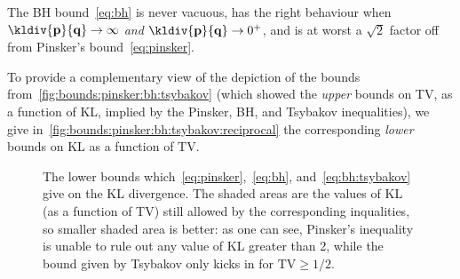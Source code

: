 \documentclass[10pt]{article}
\newcommand{\p}{\mathbf{p}}
\newcommand{\q}{\mathbf{q}}
\begin{document}
\begin{framed}
\noindent The BH bound~\eqref{eq:bh} is never vacuous, has the right behaviour when $\kldiv{\p}{\q}\to\infty$ \emph{and} $\kldiv{\p}{\q}\to 0^+$, and is at worst a $\sqrt{2}$ factor off from Pinsker's bound~\eqref{eq:pinsker}.
\end{framed}
To provide a complementary view of the depiction of the bounds from~\autoref{fig:bounds:pinsker:bh:tsybakov} (which showed the \emph{upper} bounds on TV, as a function of KL, implied by the Pinsker, BH, and Tsybakov inequalities), we give in~\autoref{fig:bounds:pinsker:bh:tsybakov:reciprocal} the corresponding \emph{lower} bounds on KL as a function of TV.

\begin{figure}[ht!]\centering
{} 
\caption{\label{fig:bounds:pinsker:bh:tsybakov:reciprocal}The lower bounds which~\eqref{eq:pinsker},~\eqref{eq:bh}, and~\eqref{eq:bh:tsybakov} give on the KL divergence. The shaded areas are the values of KL (as a function of TV) still allowed by the corresponding inqualities, so smaller shaded area is better: as one can see, Pinsker's inequality is unable to rule out any value of KL greater than 2, while the bound given by Tsybakov only kicks in for $\text{TV}\geq 1/2$.}
\end{figure}
\end{document}
